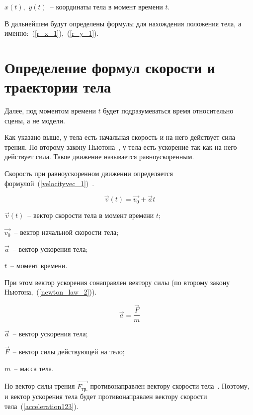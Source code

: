 \begin{Underequation}
  \(x(t)\),~\(y(t)\)~-- координаты тела в момент времени \(t\).
\end{Underequation}

В дальнейшем будут определены формулы для нахождения положения тела, а именно:~(\ref{r_x_1}),~(\ref{r_y_1}).

\section{Определение формул скорости и траектории тела}

Далее, под моментом времени \(t\) будет подразумеваться время относительно сцены, а не модели.

Как указано выше, у тела есть начальная скорость и на него действует сила трения.
По второму закону Ньютона~\cite[с.~114]{rowellherbert}, у тела есть ускорение так как на него действует сила.
Такое движение называется равноускоренным.

Скорость при равноускоренном движении определяется формулой~(\ref{velocityvec_1})~\cite[с.~96]{rowellherbert}.

\begin{equation}\label{velocityvec_1}
  \vec{v}(t) = \vec{v_0} + \vec{a}t
\end{equation}

\begin{Underequation}
  \(\vec{v}(t)\)~-- вектор скорости тела в момент времени \(t\);

  \(\vec{v_0}\)~-- вектор начальной скорости тела;

  \(\vec{a}\)~-- вектор ускорения тела;

  \(t\)~-- момент времени.
\end{Underequation}

При этом вектор ускорения сонаправлен вектору силы (по второму закону Ньютона,~(\ref{newton_law_2})).

\begin{equation}\label{newton_law_2}
  \vec{a} = \frac{\vec{F}}{m}
\end{equation}

\begin{Underequation}
  \(\vec{a}\)~-- вектор ускорения тела;

  \(\vec{F}\)~-- вектор силы действующей на тело;

  \(m\)~-- масса тела.
\end{Underequation}

Но вектор силы трения \(\vec{F_{\text{тр.}}}\) противонаправлен вектору скорости тела~\cite[с.~21]{rowellherbert}.
Поэтому, и вектор ускорения тела будет противонаправлен вектору скорости тела~(\ref{acceleration123}).

